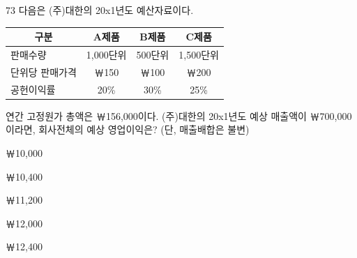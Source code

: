 \begin{question}{73}
다음은 (주)대한의 20x1년도 예산자료이다.
\par{\small\centering\begin{tabular}{|l|c|c|c|}
\hline
\multicolumn{1}{|c|}{구분} & A제품 & B제품 & C제품 \\ \hline
판매수량 & 1,000단위 & 500단위 & 1,500단위 \\ \hline
단위당 판매가격 & ￦150 & ￦100 & ￦200 \\ \hline
공헌이익률 & 20\% & 30\% & 25\% \\ \hline
\end{tabular}\par}
연간 고정원가 총액은 ￦156,000이다. (주)대한의 20x1년도 예상 매출액이 ￦700,000이라면, 회사전체의 예상 영업이익은? (단, 매출배합은 불변) \par
\begin{choices}
  \item ￦10,000
  \item ￦10,400
  \item ￦11,200
  \item ￦12,000
  \item ￦12,400
\end{choices}
\end{question}

